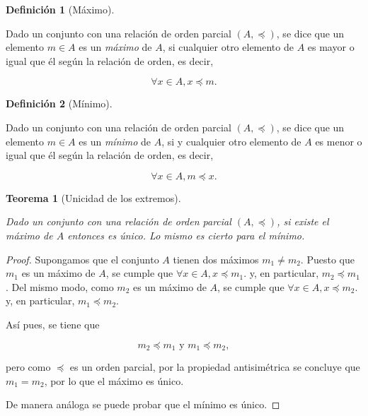 \documentclass[
  a4paper,
]{scrreport}
\theoremstyle{definition}
\theoremstyle{plain}
\theoremstyle{plain}
\newtheorem{theorem}{Teorema}[chapter]
\theoremstyle{plain}
\theoremstyle{definition}
\newtheorem{definition}{Definición}[chapter]
\theoremstyle{remark}
\begin{document}
\begin{definition}[Máximo]\protect\hypertarget{def-maximo-conjunto}{}\label{def-maximo-conjunto}

Dado un conjunto con una relación de orden parcial \((A,\preceq)\), se
dice que un elemento \(m\in A\) es un \emph{máximo} de \(A\), si
cualquier otro elemento de \(A\) es mayor o igual que él según la
relación de orden, es decir,

\[\forall x \in A, x\preceq m.\]

\end{definition}

\begin{definition}[Mínimo]\protect\hypertarget{def-minimo-conjunto}{}\label{def-minimo-conjunto}

Dado un conjunto con una relación de orden parcial \((A,\preceq)\), se
dice que un elemento \(m\in A\) es un \emph{mínimo} de \(A\), si y
cualquier otro elemento de \(A\) es menor o igual que él según la
relación de orden, es decir,

\[\forall x \in A, m\preceq x.\]

\end{definition}

\begin{theorem}[Unicidad de los
extremos]\protect\hypertarget{thm-unicidad-extremos}{}\label{thm-unicidad-extremos}

Dado un conjunto con una relación de orden parcial \((A,\preceq)\), si
existe el máximo de \(A\) entonces es único. Lo mismo es cierto para el
mínimo.

\end{theorem}

\begin{tcolorbox}[enhanced jigsaw, rightrule=.15mm, colframe=quarto-callout-note-color-frame, arc=.35mm, leftrule=.75mm, colbacktitle=quarto-callout-note-color!10!white, bottomrule=.15mm, toptitle=1mm, breakable, opacitybacktitle=0.6, coltitle=black, left=2mm, colback=white, titlerule=0mm, opacityback=0, title=\textcolor{quarto-callout-note-color}{\faInfo}\hspace{0.5em}{Demostración}, toprule=.15mm, bottomtitle=1mm]

\begin{proof}

Supongamos que el conjunto \(A\) tienen dos máximos \(m_1\neq m_2\).
Puesto que \(m_1\) es un máximo de \(A\), se cumple que
\(\forall x \in A, x\preceq m_1.\) y, en particular, \(m_2\preceq m_1\).
Del mismo modo, como \(m_2\) es un máximo de \(A\), se cumple que
\(\forall x \in A, x\preceq m_2.\) y, en particular, \(m_1\preceq m_2\).

Así pues, se tiene que

\[m_2\preceq m_1 \mbox{ y } m_1\preceq m_2,\]

pero como \(\preceq\) es un orden parcial, por la propiedad
antisimétrica se concluye que \(m_1=m_2\), por lo que el máximo es
único.

De manera análoga se puede probar que el mínimo es único.

\end{proof}

\end{tcolorbox}
\end{document}
